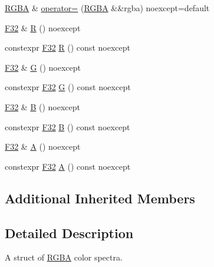 \begin{DoxyCompactItemize}
\item 
\mbox{\hyperlink{structmage_1_1_r_g_b_a}{R\+G\+BA}} \& \mbox{\hyperlink{structmage_1_1_r_g_b_a_afcac58d6a76659c2a5821b8c957fc90e}{operator=}} (\mbox{\hyperlink{structmage_1_1_r_g_b_a}{R\+G\+BA}} \&\&rgba) noexcept=default
\item 
\mbox{\hyperlink{namespacemage_aa97e833b45f06d60a0a9c4fc22ae02c0}{F32}} \& \mbox{\hyperlink{structmage_1_1_r_g_b_a_ad23a5ea8bb5dc80e4c4d6948f0f08a68}{R}} () noexcept
\item 
constexpr \mbox{\hyperlink{namespacemage_aa97e833b45f06d60a0a9c4fc22ae02c0}{F32}} \mbox{\hyperlink{structmage_1_1_r_g_b_a_a89b4f7119470ecbe1c4a9de1e2d65a58}{R}} () const noexcept
\item 
\mbox{\hyperlink{namespacemage_aa97e833b45f06d60a0a9c4fc22ae02c0}{F32}} \& \mbox{\hyperlink{structmage_1_1_r_g_b_a_af37833fee0dcd19ca286aaef7ce5cf19}{G}} () noexcept
\item 
constexpr \mbox{\hyperlink{namespacemage_aa97e833b45f06d60a0a9c4fc22ae02c0}{F32}} \mbox{\hyperlink{structmage_1_1_r_g_b_a_aa19bb0f6a025400d7eddce0b26ad4401}{G}} () const noexcept
\item 
\mbox{\hyperlink{namespacemage_aa97e833b45f06d60a0a9c4fc22ae02c0}{F32}} \& \mbox{\hyperlink{structmage_1_1_r_g_b_a_a72720b917d5f38466e42177a541f789a}{B}} () noexcept
\item 
constexpr \mbox{\hyperlink{namespacemage_aa97e833b45f06d60a0a9c4fc22ae02c0}{F32}} \mbox{\hyperlink{structmage_1_1_r_g_b_a_aab14769a4c1660bc84ee6b23dc05e246}{B}} () const noexcept
\item 
\mbox{\hyperlink{namespacemage_aa97e833b45f06d60a0a9c4fc22ae02c0}{F32}} \& \mbox{\hyperlink{structmage_1_1_r_g_b_a_aaf2ebdedafda83a3017bdc15ec13ca51}{A}} () noexcept
\item 
constexpr \mbox{\hyperlink{namespacemage_aa97e833b45f06d60a0a9c4fc22ae02c0}{F32}} \mbox{\hyperlink{structmage_1_1_r_g_b_a_ad06902ada26125cd91e4134b80712bd9}{A}} () const noexcept
\end{DoxyCompactItemize}
\subsection*{Additional Inherited Members}


\subsection{Detailed Description}
A struct of \mbox{\hyperlink{structmage_1_1_r_g_b_a}{R\+G\+BA}} color spectra. 

